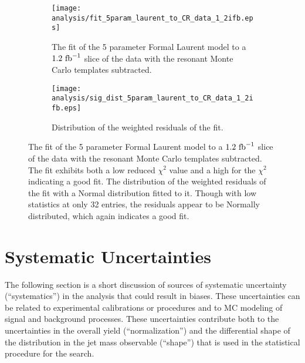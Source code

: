 \begin{figure}[htbp]
 \centering
 \begin{subfigure}[t]{0.48\textwidth}
  \centering
  \texttt{[image: analysis/fit\_5param\_laurent\_to\_CR\_data\_1\_2ifb.eps]}
  \caption[The fit of the 5 parameter Formal Laurent model to a slice of the \CRQCD{} data.]{%
   The fit of the 5 parameter Formal Laurent model to a $1.2~\mathrm{fb}^{-1}$ slice of the \CRQCD{} data with the resonant Monte Carlo templates subtracted.}
  \label{fig:fit_5param_laurent_to_CR_data_1_2ifb}
 \end{subfigure}%
 \quad
 \begin{subfigure}[t]{0.48\textwidth}
  \centering
  \texttt{[image: analysis/sig\_dist\_5param\_laurent\_to\_CR\_data\_1\_2ifb.eps]}
  \caption[Distribution of the weighted residuals of the fit.]{%
   Distribution of the weighted residuals of the fit.}
  \label{fig:sig_dist_5param_laurent_to_CR_data_1_2ifb}
 \end{subfigure}%
 \caption[The fit and fit residuals of the 5 parameter Formal Laurent model to a slice of the \CRQCD{} data.]{%
  The fit of the 5 parameter Formal Laurent model to a $1.2~\mathrm{fb}^{-1}$ slice of the \CRQCD{} data with the resonant Monte Carlo templates subtracted.
  The fit exhibits both a low reduced $\chi^{2}$ value and a high \pvalue{} for the $\chi^{2}$ indicating a good fit.
  The distribution of the weighted residuals of the fit with a Normal distribution fitted to it.
  Though with low statistics at only 32 entries, the residuals appear to be Normally distributed, which again indicates a good fit.}
 \label{fig:5param_QCD_model_fit_laurent}
\end{figure}

\clearpage
\section{Systematic Uncertainties}\label{sec:systematic_uncertainties}

The following section is a short discussion of sources of systematic uncertainty (``systematics'') in the analysis that could result in biases.
These uncertainties can be related to experimental calibrations or procedures and to MC modeling of signal and background processes.
These uncertainties contribute both to the uncertainties in the overall yield (``normalization'') and the differential shape of the distribution in the \largeR{} jet mass observable (``shape'') that is used in the statistical procedure for the search.


